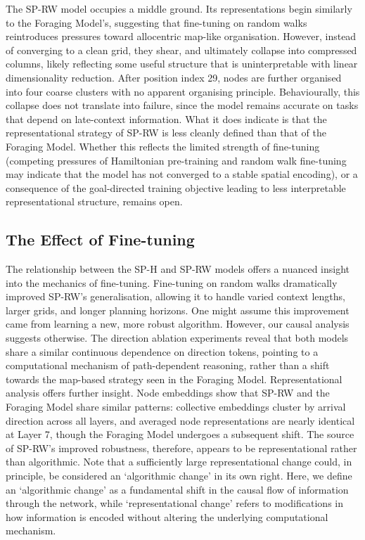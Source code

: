 The SP-RW model occupies a middle ground. Its representations begin similarly to the Foraging Model’s, suggesting that fine-tuning on random walks reintroduces pressures toward allocentric map-like organisation. However, instead of converging to a clean grid, they shear, and ultimately collapse into compressed columns, likely reflecting some useful structure that is uninterpretable with linear dimensionality reduction. After position index 29, nodes are further organised into four coarse clusters with no apparent organising principle. Behaviourally, this collapse does not translate into failure, since the model remains accurate on tasks that depend on late-context information. What it does indicate is that the representational strategy of SP-RW is less cleanly defined than that of the Foraging Model. Whether this reflects the limited strength of fine-tuning (competing pressures of Hamiltonian pre-training and random walk fine-tuning may indicate that the model has not converged to a stable spatial encoding), or a consequence of the goal-directed training objective leading to less interpretable representational structure, remains open.


\subsection{The Effect of Fine-tuning}

The relationship between the SP-H and SP-RW models offers a nuanced insight into the mechanics of fine-tuning. Fine-tuning on random walks dramatically improved SP-RW’s generalisation, allowing it to handle varied context lengths, larger grids, and longer planning horizons. One might assume this improvement came from learning a new, more robust algorithm. However, our causal analysis suggests otherwise. The direction ablation experiments reveal that both models share a similar continuous dependence on direction tokens, pointing to a computational mechanism of path-dependent reasoning, rather than a shift towards the map-based strategy seen in the Foraging Model. Representational analysis offers further insight. Node embeddings show that SP-RW and the Foraging Model share similar patterns: collective embeddings cluster by arrival direction across all layers, and averaged node representations are nearly identical at Layer 7, though the Foraging Model undergoes a subsequent shift. The source of SP-RW's improved robustness, therefore, appears to be representational rather than algorithmic. Note that a sufficiently large representational change could, in principle, be considered an `algorithmic change' in its own right. Here, we define an `algorithmic change' as a fundamental shift in the causal flow of information through the network, while `representational change' refers to modifications in how information is encoded without altering the underlying computational mechanism. 


